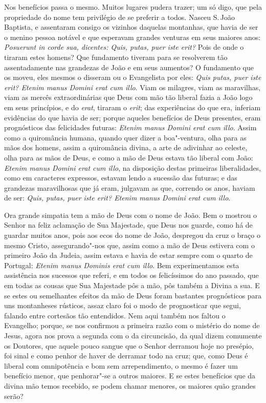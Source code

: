 Nos benefícios passa o mesmo. Muitos lugares pudera trazer; um só digo,
que pela propriedade do nome tem privilégio de se preferir a todos.
Nasceu S.\,João Baptista, e assentaram consigo os vizinhos daquelas
montanhas, que havia de ser o menino pessoa notável e que esperavam
grandes venturas em seus maiores anos: \emph{Posuerunt in corde sua,
dicentes: Quis, putas, puer iste erit?} Pois de onde o tiraram estes
homens? Que fundamento tiveram para se resolverem tão assentadamente nas
grandezas de João e em seus aumentos? O fundamento que os moveu, eles
mesmos o disseram ou o Evangelista por eles: \emph{Quis putas, puer iste
erit? Etenim manus Domini erat cum illo}. Viam os milagres, viam as
maravilhas, viam as mercês extraordinárias que Deus com mão tão liberal
fazia a João logo em seus princípios, e do \emph{erat}, tiraram o
\emph{erit}; das experiências do que era, inferiam evidências do que
havia de ser; porque aqueles benefícios de Deus presentes, eram
prognósticos das felicidades futuras: \emph{Etenim manus Domini erat cum
illo}. Assim como a quiromância humana, quando quer dizer a boa"-ventura,
olha para as mãos dos homens, assim a quiromância divina, a arte de
adivinhar ao celeste, olha para as mãos de Deus, e como a mão de Deus
estava tão liberal com João: \emph{Etenim manus Domini erat cum illo},
na disposição destas primeiras liberalidades, como em caracteres
expressos, estavam lendo a sucessão das futuras; e das grandezas
maravilhosas que já eram,
julgavam as que, correndo os anos, haviam de ser: \emph{Quis, putas,
puer iste erit? Etenim manus Domini erat cum illo}.

Ora grande simpatia tem a mão de Deus com o nome de João. Bem o mostrou
o Senhor na feliz aclamação de Sua Majestade, que Deus nos guarde, como
há de guardar muitos anos, pois aos ecos do nome de João, despregou da
cruz o braço o mesmo Cristo, assegurando"-nos que, assim como a mão de
Deus estivera com o primeiro João da Judeia, assim estava e havia de
estar sempre com o quarto de Portugal: \emph{Etenim manus Dominis erat
cum illo}. Bem experimentamos esta assistência nos sucessos que referi,
e em todos os felicíssimos do ano passado, que em todas as cousas que
Sua Majestade pôs a mão, pôs também a Divina a sua. E se estes ou
semelhantes efeitos da mão de Deus foram bastantes prognósticos para uns
montanheses rústicos, assaz claro foi o modo de prognosticar que segui,
falando entre cortesãos tão entendidos. Nem aqui também nos faltou o
Evangelho; porque, se nos confirmou a primeira razão com o mistério do
nome de Jesus, agora nos prova a segunda com o da circuncisão, da qual
dizem comumente os Doutores, que aquele pouco sangue que o Senhor
derramou hoje no presépio, foi sinal e como penhor de haver de derramar
todo na cruz; que, como Deus é liberal com omnipotência e bom sem
arrependimento, o mesmo é fazer um benefício menor, que penhorar"-se a
outros maiores. E se estes benefícios que da divina mão temos recebido,
se podem chamar menores, os maiores quão grandes serão?

